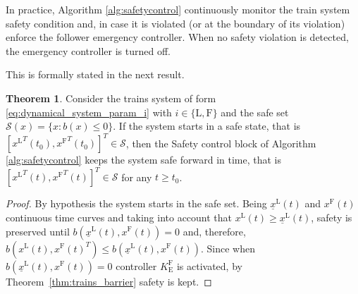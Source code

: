 \documentclass[letterpaper, 10 pt, conference]{ieeeconf}
\theoremstyle{definition}
\theoremstyle{nopoint}
\newtheorem{theorem}{Theorem}[section]
\newcounter{Theorem}
\newcommand{\tildeAdd}{~}
\begin{document}
In practice, Algorithm \ref{alg:safetycontrol} continuously monitor the train system safety condition and, in case it is violated (or at the boundary of its violation) enforce the follower emergency controller. When no safety violation is detected, the emergency controller is turned off. 

This is formally stated in the next result. 


\begin{theorem}\label{thm:safetycontrol} 
Consider the trains system of form \eqref{eq:dynamical_system_param_i} with $i\in\{\mathrm{L},\mathrm{F}\}$ and the safe set $\mathcal{S}(x)=\{x: b(x)\leq 0\}$. 
If the system starts in a safe state, that is $[{x^\mathrm{L}}^T(t_0),{x^\mathrm{F}}^T(t_0)]^T\in\mathcal{S}$, then the Safety control block of Algorithm \ref{alg:safetycontrol} keeps the system safe forward in time, that is $[{x^\mathrm{L}}^T(t),{x^\mathrm{F}}^T(t)]^T\in\mathcal{S}$ for any $t\geq t_0$.
\begin{proof}
By hypothesis the system starts in the safe set. Being $\underline{x}^\mathrm{L}(t)$ and ${x^\mathrm{F}}(t)$ continuous time curves and taking into account that $x^\mathrm{L}(t)\geq  \underline{x}^\mathrm{L}(t)$, safety is preserved until $b({\underline{x}^\mathrm{L}}(t),{x^\mathrm{F}}(t))=0$ and, therefore,  $b({x^\mathrm{L}}(t),{x^\mathrm{F}}(t)^T)\leq b({\underline{x}^\mathrm{L}}(t),{x^\mathrm{F}}(t))$. Since when $b({\underline{x}^\mathrm{L}}(t),{x^\mathrm{F}}(t))=0$ controller $K_\mathrm{E}^\mathrm{F}$ is activated, by Theorem\tildeAdd\ref{thm:trains_barrier} safety is kept. 
\end{proof}
\end{theorem}
\end{document}
